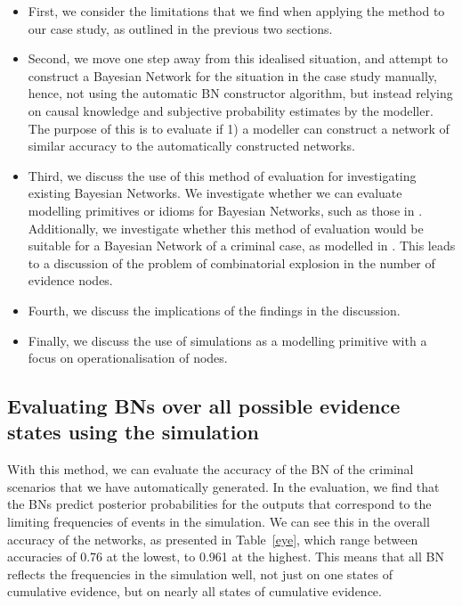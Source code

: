 \documentclass[12pt]{article}
\begin{document}
\begin{itemize}
\item First, we consider the limitations that we find when applying the method to our case study, as outlined in the previous two sections. 
\item Second, we move one step away from this idealised situation, and attempt to construct a Bayesian Network for the situation in the case study manually, hence, not using the automatic BN constructor algorithm, but instead relying on causal knowledge and subjective probability estimates by the modeller. The purpose of this is to evaluate if 1) a modeller can construct a network of similar accuracy to the automatically constructed networks. 
\item Third, we discuss the use of this method of evaluation for investigating existing Bayesian Networks. We investigate whether we can evaluate modelling primitives or idioms for Bayesian Networks, such as those in \citep{deZoete2019}. Additionally, we investigate whether this method of evaluation would be suitable for a Bayesian Network of a criminal case, as modelled in \citep{vanLeeuwen2019}. This leads to a discussion of the problem of combinatorial explosion in the number of evidence nodes.
\item Fourth, we discuss the implications of the findings in the discussion.
\item Finally, we discuss the use of simulations as a modelling primitive with a focus on operationalisation of nodes.

\end{itemize}


\subsection{Evaluating BNs over all possible evidence states using the simulation}

With this method, we can evaluate the accuracy of the BN of the criminal scenarios that we have automatically generated. In the evaluation, we find that the BNs predict posterior probabilities for the outputs that correspond to the limiting frequencies of events in the simulation. We can see this in the overall accuracy of the networks, as presented in Table~\ref{eye}, which range between accuracies of 0.76 at the lowest, to 0.961 at the highest. This means that all BN reflects the frequencies in the simulation well, not just on one states of cumulative evidence, but on nearly all states of cumulative evidence. 
\end{document}
